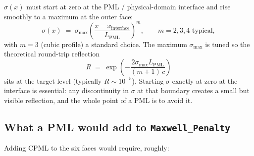 \documentclass[11pt]{article}
\begin{document}
$\sigma(x)$ must start at zero at the PML / physical-domain
interface and rise smoothly to a maximum at the outer face:
\begin{equation}
  \sigma(x) \;=\; \sigma_{\max}
  \left( \frac{x - x_{\text{interface}}}{L_{\text{PML}}} \right)^m,
  \qquad m = 2, 3, 4 \text{ typical},
\end{equation}
with $m = 3$ (cubic profile) a standard choice. The maximum
$\sigma_{\max}$ is tuned so the theoretical round-trip reflection
\begin{equation}
  R \;=\; \exp\!\left(
    -\frac{2 \sigma_{\max} L_{\text{PML}}}{(m+1) \, c}
  \right)
\end{equation}
sits at the target level (typically $R \sim 10^{-5}$). Starting
$\sigma$ exactly at zero at the interface is essential: any
discontinuity in $\sigma$ at that boundary creates a small but
visible reflection, and the whole point of a PML is to avoid it.

\subsection{What a PML would add to \texttt{Maxwell\_Penalty}}

Adding CPML to the six faces would require, roughly:
\end{document}
